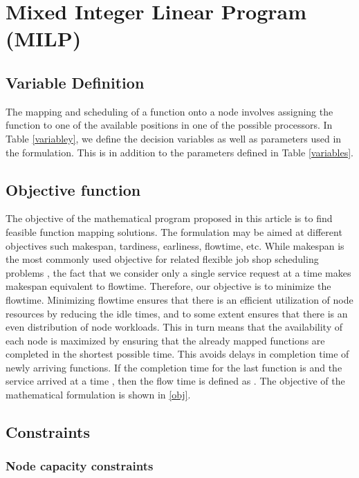 \documentclass[conference]{IEEEtran}
\begin{document}
\section{Mixed Integer Linear Program (MILP)}\label{milp}

\subsection{Variable Definition}

The mapping and scheduling of a function onto a node involves assigning the function to one of the available positions in one of the possible processors. In Table \ref{variabley}, we define the decision variables as well as parameters used in the formulation. This is in addition to the parameters defined in Table \ref{variables}.
\subsection{Objective function}
The objective of the mathematical program proposed in this article is to find feasible function mapping solutions. The formulation may be aimed at different objectives such makespan, tardiness, earliness, flowtime, etc. While makespan  is the most commonly used objective for related flexible job shop scheduling problems \cite{Roshanaei13}, the fact that we consider only a single service request at a time makes makespan equivalent to flowtime. Therefore, our objective is to minimize the flowtime. Minimizing flowtime ensures that there is an efficient utilization of node resources by reducing the idle times, and to some extent ensures that there is an even distribution of node workloads. This in turn means that the availability of each node is maximized by ensuring that the already mapped functions are completed in the shortest possible time. This avoids delays in completion time of newly arriving functions. If the completion time for the last function  is  and the service arrived at a time , then the flow time is defined as . The objective of the mathematical formulation is shown in \eqref{obj}. 



\subsection{Constraints}

\subsubsection{Node capacity constraints}
\end{document}
